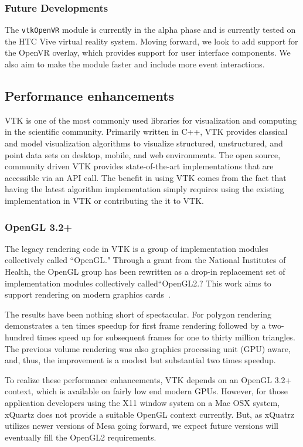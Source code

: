 \subsubsection{Future Developments}

The \texttt{vtkOpenVR}  module is currently in the alpha phase and is currently tested on the HTC Vive virtual reality system.
Moving forward, we look to add support for the OpenVR overlay, which provides support for user interface components.
We also aim to make the module faster and include more event interactions. 

\subsection{Performance enhancements}

VTK is one of the most commonly used libraries for visualization and computing in the scientific community.
Primarily written in C++, VTK provides classical and model visualization algorithms to visualize structured, unstructured, and point data sets on desktop, mobile, and web environments.
The open source, community driven VTK provides state-of-the-art implementations that are accessible via an API call.
The benefit in using VTK comes from the fact that having the latest algorithm implementation simply requires using the existing implementation in VTK or contributing the it to VTK.

\subsubsection{OpenGL 3.2+}

The legacy rendering code in VTK is a group of implementation modules collectively called ``OpenGL."
Through a grant from the National Institutes of Health, the OpenGL group has been rewritten as a drop-in replacement set of implementation modules collectively called``OpenGL2.?
This work aims to support rendering on modern graphics cards~\cite{Hanwell:2015}.

The results have been nothing short of spectacular.
For polygon rendering demonstrates a ten times speedup for first frame rendering followed by a two-hundred times speed up for subsequent frames for one to thirty million triangles.
The previous volume rendering was also graphics processing unit (GPU) aware, and, thus, the improvement is a modest but substantial two times speedup. 

To realize these performance enhancements, VTK depends on an OpenGL 3.2+ context, which is available on fairly low end modern GPUs.
However, for those application developers using the X11 window system on a Mac OSX system, xQuartz does not provide a suitable OpenGL context currently.
But, as xQuatrz utilizes newer versions of Mesa going forward, we expect future versions will eventually fill the OpenGL2 requirements.

